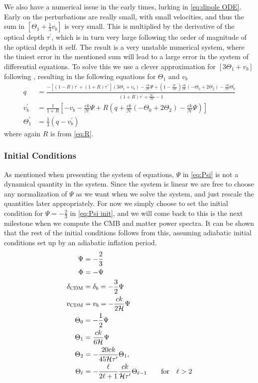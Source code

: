 \documentclass[10pt,a4paper]{article}
\begin{document}
We also have a numerical issue in the early times, lurking in \cref{eq:dipole ODE}. Early on the perturbations are really small, with small velocities, and thus the sum in $\left[\Theta_1 + \frac{1}{3}v_b\right]$ is very small. This is multiplied by the derivative of the optical depth $\tau^\prime$, which is in turn very large following the order of magnitude of the optical depth it self. The result is a very unstable numerical system, where the tiniest error in the mentioned sum will lead to a large error in the system of differential equations. To solve this we use a clever approximation for $\left[3\Theta_1 + v_b\right]$ following \cite{Calin}, resulting in the following equations for $\Theta_1$ and $v_b$
\begin{align}
  q &= \frac{-[(1-R)\tau^\prime + (1+R)\tau^{\prime\prime}](3\Theta_1+v_b) -
  \frac{ck}{\mathcal{H}}\Psi + (1-\frac{\mathcal{H}^\prime}{\mathcal{H}})\frac{ck}{\mathcal{H}}(-\Theta_0 +
  2\Theta_2) - \frac{ck}{\mathcal{H}}\Theta_0^\prime}{(1+R)\tau^\prime + \frac{\mathcal{H}^\prime}{\mathcal{H}} -
  1}
  \\
  v_b^\prime &= \frac{1}{1+R} \left[-v_b - \frac{ck}{\mathcal{H}}\Psi + R(q +
  \frac{ck}{\mathcal{H}}(-\Theta_0 + 2\Theta_2) - \frac{ck}{\mathcal{H}}\Psi)\right]
  \\
  \Theta^\prime_1 &= \frac{1}{3} (q - v_b^\prime)
\end{align}
where again $R$ is from \cref{eq:R}.

\subsubsection{Initial Conditions}
\label{subsubsec:Theory/Initial conditions}
As mentioned when presenting the system of equations, $\Psi$ in \cref{eq:Psi} is not a dynamical quantity in the system. Since the system is linear we are free to choose any normalization of $\Psi$ as we want when we solve the system, and just rescale the quantities later appropriately. For now we simply choose to set the initial condition for $\Psi = -\frac{2}{3}$ in \cref{eq:Psi init}, and we will come back to this is the next milestone when we compute the CMB and matter power spectra. It can be shown that the rest of the initial conditions follows from this, assuming adiabatic initial conditions set up by an adiabatic inflation period.
\begin{align}
  \Psi &= -\frac{2}{3} \label{eq:Psi init}
  \\
  \Phi &= -\Psi
  \\
  \delta_{\rm CDM} &= \delta_b = -\frac{3}{2} \Psi 
  \\
  v_{\rm CDM} &= v_b = -\frac{ck}{2\mathcal{H}} \Psi
  \\
  \Theta_0 &= -\frac{1}{2} \Psi 
  \\
  \Theta_1 &= \frac{ck}{6\mathcal{H}}\Psi 
  \\
  \Theta_2 &= -\frac{20ck}{45\mathcal{H}\tau^\prime} \Theta_1,
  \\
  \Theta_\ell &= -\frac{\ell}{2\ell+1} \frac{ck}{\mathcal{H}\tau^\prime} \Theta_{\ell-1} \quad \qfor \ell > 2
\end{align}
\end{document}
